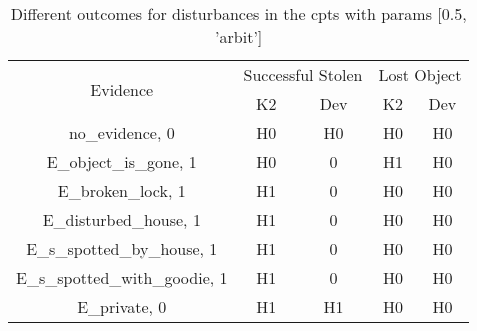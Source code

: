 \begin{table}\begin{tabular}{c|cc|cc}\toprule\multirow{2}{*}{Evidence} & \multicolumn{2}{c}{Successful Stolen} & \multicolumn{2}{c}{Lost Object} \\& {K2} & {Dev} & {K2} & {Dev} \\\midrule
no\_evidence, 0 & H0&H0&H0&H0\\E\_object\_is\_gone, 1 & \cellcolor{Bittersweet}H0&\cellcolor{Bittersweet}0&\cellcolor{Bittersweet}H1&\cellcolor{Bittersweet}H0\\E\_broken\_lock, 1 & \cellcolor{Bittersweet}H1&\cellcolor{Bittersweet}0&H0&H0\\E\_disturbed\_house, 1 & \cellcolor{Bittersweet}H1&\cellcolor{Bittersweet}0&H0&H0\\E\_s\_spotted\_by\_house, 1 & \cellcolor{Bittersweet}H1&\cellcolor{Bittersweet}0&H0&H0\\E\_s\_spotted\_with\_goodie, 1 & \cellcolor{Bittersweet}H1&\cellcolor{Bittersweet}0&H0&H0\\E\_private, 0 & H1&H1&H0&H0\\\bottomrule\end{tabular}\caption{Different outcomes for disturbances in the cpts with params [0.5, 'arbit']}\end{table}